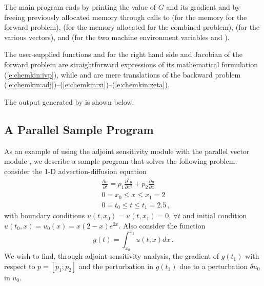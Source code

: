 The main program ends by printing the value of $G$ and its gradient and by
freeing previously allocated memory through calls to  (for the
{\cvodes} memory for the forward problem),  (for the memory
allocated for the combined problem),  (for the various vectors), 
and  (for the two machine environment variables
 and ).

The user-supplied functions  and  for the right hand side and
Jacobian of the forward problem are straightforward expressions of its 
mathematical formulation (\ref{e:chemkin:ivp}), while  and 
are mere translations of the backward problem
(\ref{e:chemkin:adj})--(\ref{e:chemkin:xi})--(\ref{e:chemkin:zeta}).

The output generated by  is shown below.
{\small}


\subsection{A Parallel Sample Program}\label{ss:parallel_adj_ex}

As an example of using the {\cvodes} adjoint sensitivity module with
the parallel vector module {\nvecp}, we describe a sample program
that solves the following problem: consider the 1-D advection-diffusion
equation
\begin{equation}\label{e:pvanx:orig_pde}
  \begin{split}
    & \frac{\partial u}{\partial t} = p_1 \frac{\partial^2 u}{\partial x^2} 
    + p_2 \frac{\partial u}{\partial x} \\
    & 0 = x_0 \le x \le x_1 = 2 \\
    & 0 = t_0 \le t \le t_1 = 2.5 \, ,
  \end{split}
\end{equation}
with boundary conditions $u(t,x_0) = u(t,x_1) = 0 ,\, \forall t$
and initial condition $u(t_0 , x) = u_0(x) = x(2-x)e^{2x}$. Also
consider the function
\begin{equation*}
  g(t) = \int_{x_0}^{x_1} u(t,x) dx \, .
\end{equation*}
We wish to find, through adjoint sensitivity analysis, the gradient of
$g(t_1)$ with respect to $p = [p_1 ; p_2]$ and the perturbation in $g(t_1)$
due to a perturbation $\delta u_0$ in $u_0$.

